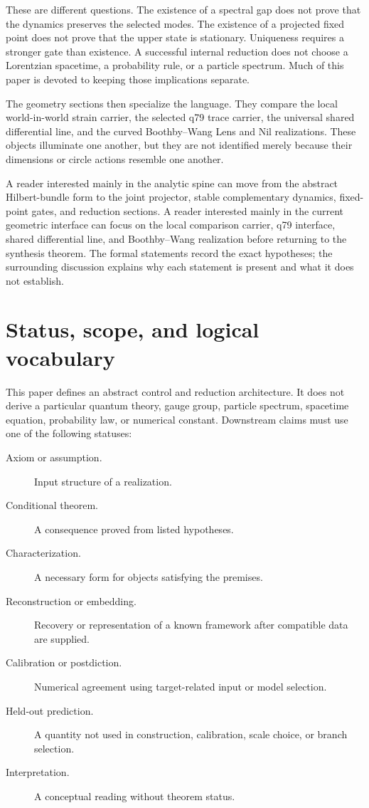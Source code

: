 \documentclass[11pt]{article}
\begin{document}
These are different questions. The existence of a spectral gap does not prove
that the dynamics preserves the selected modes. The existence of a projected
fixed point does not prove that the upper state is stationary. Uniqueness
requires a stronger gate than existence. A successful internal reduction does
not choose a Lorentzian spacetime, a probability rule, or a particle spectrum.
Much of this paper is devoted to keeping those implications separate.

The geometry sections then specialize the language. They compare the local
world-in-world strain carrier, the selected q79 trace carrier, the universal
shared differential line, and the curved Boothby--Wang Lens and Nil
realizations. These objects illuminate one another, but they are not
identified merely because their dimensions or circle actions resemble one
another.

A reader interested mainly in the analytic spine can move from the abstract
Hilbert-bundle form to the joint projector, stable complementary dynamics,
fixed-point gates, and reduction sections. A reader interested mainly in the
current geometric interface can focus on the local comparison carrier, q79
interface, shared differential line, and Boothby--Wang realization before
returning to the synthesis theorem. The formal statements record the exact
hypotheses; the surrounding discussion explains why each statement is present
and what it does not establish.

\section{Status, scope, and logical vocabulary}

This paper defines an abstract control and reduction architecture. It does not
derive a particular quantum theory, gauge group, particle spectrum, spacetime
equation, probability law, or numerical constant. Downstream claims must use
one of the following statuses:
\begin{description}
\item[Axiom or assumption.] Input structure of a realization.
\item[Conditional theorem.] A consequence proved from listed hypotheses.
\item[Characterization.] A necessary form for objects satisfying the premises.
\item[Reconstruction or embedding.] Recovery or representation of a known
framework after compatible data are supplied.
\item[Calibration or postdiction.] Numerical agreement using target-related
input or model selection.
\item[Held-out prediction.] A quantity not used in construction, calibration,
scale choice, or branch selection.
\item[Interpretation.] A conceptual reading without theorem status.
\end{description}
\end{document}
